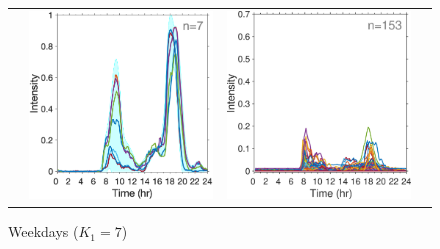 \documentclass{article}
\begin{document}
\begin{figure}[h!]
\begin{center}
\begin{tabular}{cccc}
			&\hspace*{-0.6cm}
			\includegraphics[scale=0.1]{../2Fittedy/plot/weekday_7/fitted_y_cluster7_7.eps}
			&\hspace*{-0.6cm}
			\includegraphics[scale=0.1]{../2Fittedy/plot/weekday_7/remove_data.eps}
		\end{tabular}
		
		
		\caption{Weekdays ($K_1=7$)}
		\label{Fig:clustering_Weekdays}		
	\end{center}

\end{figure}
\end{document}
